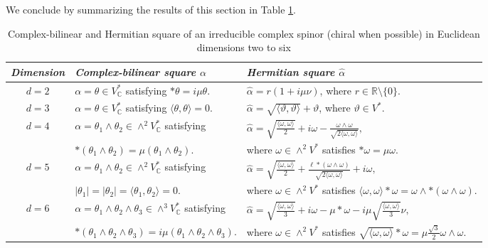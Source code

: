 \documentclass[10pt,a4paper,twoside,reqno]{amsart}
\theoremstyle{plain}
\theoremstyle{definition}
\theoremstyle{remark}
\def\C{\mathbb{C}}
\def\R{\mathbb{R}}
\def\R{\mathbb{R}}
\newcommand{\abs}[1]{\left\lvert#1\right\rvert}
\newcommand{\escal}[1]{\langle#1\rangle}
\begin{document}
We conclude by summarizing the results of this section in Table \ref{tab:spinor_squares_plain}.

\begin{table}[!ht]
\centering
\caption{Complex-bilinear and Hermitian square of an irreducible complex spinor (chiral when possible) in Euclidean dimensions two to six}
\label{tab:spinor_squares_plain}
\renewcommand{\arraystretch}{1.8} 
\begin{tabular}{|c|p{6cm}|p{6cm}|}
\hline
\emph{Dimension} & \emph{Complex-bilinear square $\alpha$} & \emph{Hermitian square $\widehat{\alpha}$} \\
\hline
$d=2$ & 
$\alpha=\theta\in V^*_\C$ satisfying $*\theta=i\mu\theta$. & 
$\widehat{\alpha}=r(1+i\mu\nu)$, where $r\in\R\setminus\{0\}$.\\
\hline
$d=3$ & 
$\alpha=\theta\in V^*_\C$ satisfying $\escal{\theta,\theta}=0$. & 
$\widehat{\alpha}=\sqrt{\escal{\vartheta,\vartheta}}+\vartheta$, where $\vartheta\in V^*$.\\
\hline
$d=4$ & 
$\alpha=\theta_1\wedge\theta_2\in \wedge^2V^*_\C$ satisfying& 
$\widehat{\alpha}=\sqrt{\frac{ \escal{\omega,\omega}}{2}} + i\omega - \frac{\omega\wedge \omega}{\sqrt{2\escal{\omega,\omega}}},$\\
&$*(\theta_1\wedge\theta_2)=\mu(\theta_1\wedge\theta_2)$.&where $\omega\in\wedge^2V^*$ satisfies $*\omega=\mu\omega$.\\
\hline
$d=5$ & 
$\alpha=\theta_1\wedge\theta_2\in \wedge^2V^*_\C$ satisfying& 
$\widehat{\alpha} = \sqrt{\frac{\escal{\omega,\omega}}{2}} + \frac{\ell *(\omega\wedge\omega)}{\sqrt{2\escal{\omega,\omega}}}+i\omega,$\\
&$\abs{\theta_1}=\abs{\theta_2}=\escal{\theta_1,\theta_2}=0$.&where $\omega\in\wedge^2V^*$ satisfies $\escal{\omega,\omega} \ast \omega = \omega\wedge*(\omega\wedge\omega)$.\\
\hline
$d=6$ & 
$\alpha=\theta_1\wedge\theta_2\wedge\theta_3\in \wedge^3V^*_\C$ satisfying& 
$\widehat{\alpha} = \sqrt{\frac{\escal{\omega,\omega}}{3}} + i\omega-\mu*\omega-i\mu\sqrt{\frac{\escal{\omega,\omega}}{3}}\nu,$\\
&$*(\theta_1\wedge\theta_2\wedge\theta_3)=i\mu(\theta_1\wedge\theta_2\wedge\theta_3)$.&where $\omega\in\wedge^2V^*$ satisfies $\sqrt{\escal{\omega,\omega}}*\omega=\mu\frac{\sqrt{3}}{2}\omega\wedge\omega$.\\
\hline
\end{tabular}
\end{table}

\end{document}
